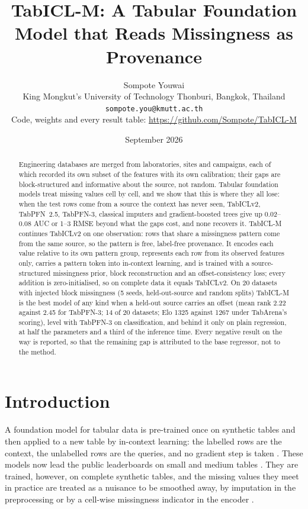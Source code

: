 \documentclass[11pt]{article}
\title{\textbf{TabICL-M: A Tabular Foundation Model that Reads Missingness as Provenance}}
\author{Sompote Youwai\\
King Mongkut's University of Technology Thonburi, Bangkok, Thailand\\
\texttt{sompote.you@kmutt.ac.th}\\[0.4em]
\small Code, weights and every result table: \url{https://github.com/Sompote/TabICL-M}}
\date{September 2026}
\begin{document}
\maketitle

\begin{abstract}
Engineering databases are merged from laboratories, sites and campaigns, each of which
recorded its own subset of the features with its own calibration; their gaps are
block-structured and informative about the source, not random. Tabular foundation
models treat missing values cell by cell, and we show that this is where they all lose:
when the test rows come from a source the context has never seen, TabICLv2, TabPFN~2.5,
TabPFN-3, classical imputers and gradient-boosted trees give up 0.02--0.08 AUC or 1--3
RMSE beyond what the gaps cost, and none recovers it. TabICL-M continues TabICLv2 on
one observation: rows that share a missingness pattern come from the same source, so the
pattern is free, label-free provenance. It encodes each value relative to its own
pattern group, represents each row from its observed features only, carries a pattern
token into in-context learning, and is trained with a source-structured missingness
prior, block reconstruction and an offset-consistency loss; every addition is
zero-initialised, so on complete data it equals TabICLv2. On 20 datasets with injected
block missingness (5 seeds, held-out-source and random splits) TabICL-M is the best
model of any kind when a held-out source carries an offset (mean rank 2.22 against 2.45
for TabPFN-3; 14 of 20 datasets; Elo 1325 against 1267 under TabArena's scoring), level
with TabPFN-3 on classification, and behind it only on plain regression, at half the
parameters and a third of the inference time. Every negative result on the way is
reported, so that the remaining gap is attributed to the base regressor, not to the
method.
\end{abstract}

\section{Introduction}

A foundation model for tabular data is pre-trained once on synthetic tables and then
applied to a new table by in-context learning: the labelled rows are the context, the
unlabelled rows are the queries, and no gradient step is taken \citep{hollmann2023tabpfn,
hollmann2025tabpfnv2, qu2025tabicl}. These models now lead the public leaderboards on
small and medium tables \citep{erickson2025tabarena}. They are trained, however, on
complete synthetic tables, and the missing values they meet in practice are treated
as a nuisance to be smoothed away, by imputation in the preprocessing or by a
cell-wise missingness indicator in the encoder \citep{hollmann2025tabpfnv2}.
\end{document}
